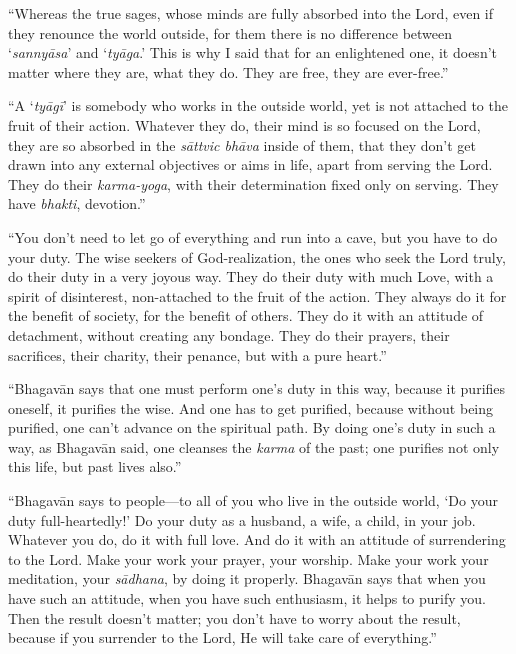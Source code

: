 \enquote{Whereas the true sages, whose minds are fully absorbed into the Lord, even if they renounce the world outside, for them there is no difference between \enquote{\textit{sannyāsa}} and \enquote{\textit{tyāga}.} This is why I said that for an enlightened one, it doesn’t matter where they are, what they do. They are free, they are ever-free.}

\enquote{A \enquote{\textit{tyāgī}} is somebody who works in the outside world, yet is not attached to the fruit of their action. Whatever they do, their mind is so focused on the Lord, they are so absorbed in the \textit{sāttvic bhāva} inside of them, that they don’t get drawn into any external objectives or aims in life, apart from serving the Lord. They do their \textit{karma-yoga}, with their determination fixed only on serving. They have \textit{bhakti}, devotion.}

\enquote{You don’t need to let go of everything and run into a cave, but you have to do your duty. The wise seekers of God-realization, the ones who seek the Lord truly, do their duty in a very joyous way. They do their duty with much Love, with a spirit of disinterest, non-attached to the fruit of the action. They always do it for the benefit of society, for the benefit of others. They do it with an attitude of detachment, without creating any bondage. They do their prayers, their sacrifices, their charity, their penance, but with a pure heart.}

\enquote{Bhagavān says that one must perform one’s duty in this way, because it purifies oneself, it purifies the wise. And one has to get purified, because without being purified, one can’t advance on the spiritual path. By doing one’s duty in such a way, as Bhagavān said, one cleanses the \textit{karma} of the past; one purifies not only this life, but past lives also.}

\enquote{Bhagavān says to people---to all of you who live in the outside world, \enquote{Do your duty full-heartedly!} Do your duty as a husband, a wife, a child, in your job. Whatever you do, do it with full love. And do it with an attitude of surrendering to the Lord. Make your work your prayer, your worship. Make your work your meditation, your \textit{sādhana}, by doing it properly. Bhagavān says that when you have such an attitude, when you have such enthusiasm, it helps to purify you. Then the result doesn’t matter; you don’t have to worry about the result, because if you surrender to the Lord, He will take care of everything.}

